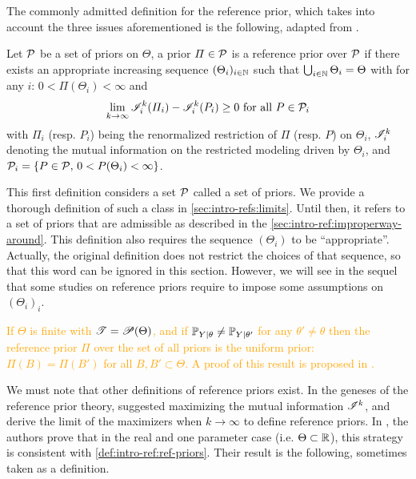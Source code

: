 The commonly admitted definition for the reference prior, which takes into account the three issues aforementioned is the following, adapted from \cite{dey_reference_2005}.
\begin{defi}\label{def:intro-ref:ref-priors}
    Let $\mathcal{P}$ be a set of priors on $\Theta$, a prior $\varPi\in\mathcal{P}$ %
    is a reference prior over $\mathcal{P}$ if there exists an appropriate increasing sequence $(\Theta_i)_{i\in\mathbb{N}}$ such that $\bigcup_{i\in\mathbb{N}}\Theta_i=\Theta$ with for any $i$: $0<\varPi(\Theta_i)<\infty  $ and
        \begin{equation}
            \lim_{k\rightarrow\infty} \mathscr{I}^k_i(\varPi_i) - \mathscr{I}^k_i(P_i) \geq 0 \text{\ for all\ } P\in\mathcal{P}_i
        \end{equation}
    with $\varPi_i$ (resp. $P_i$) being the renormalized restriction of $\varPi$ (resp. $P$) on $\Theta_i$, $\mathscr{I}_i^k$ denoting the mutual information on the restricted modeling driven by $\Theta_i$, and $\mathcal{P}_i=\{P\in\mathcal{P},\,0<P(\Theta_i)<\infty\}$.
\end{defi}

This first definition considers a set $\mathcal{P}$ called a set of priors. 
We provide a thorough definition of such a class in \cref{sec:intro-refs:limits}.
Until then, it refers to a set of priors that are admissible as described in the \cref{sec:intro-ref:improperway-around}.
This definition also
requires the sequence $(\Theta_i)$ to be ``appropriate''.
Actually,  the original definition does not restrict the choices of that sequence, so that this word can be ignored in this section.
However, we will see in the sequel that some studies on reference priors require to impose some assumptions on $(\Theta_i)_i$. 

\textcolor{orange}{
\begin{ex}
    If $\Theta$ is finite with $\mathscr{T}=\mathscr{P}(\Theta)$, and if $\mathbb{P}_{Y|\theta}\ne\mathbb{P}_{Y|\theta'}$ for any $\theta'\ne\theta$ then the reference prior $\varPi$ over the set of all priors is the uniform prior: $\varPi(B)=\varPi(B')$ for all $B,B'\subset\Theta$. A proof of this result is proposed in \cite{mure_objective_2018}.
\end{ex}
}


We must note that other definitions of reference priors exist.
In the geneses of the reference prior theory, \citet{bernardo_reference_1979} suggested maximizing the mutual information $\mathscr{I}^k$, and derive the limit of the maximizers when $k\to\infty$ to define reference priors.
In \cite{berger_formal_2009}, the authors prove that in the real and one parameter case (i.e. $\Theta\subset\mathbb{R}$), this strategy is consistent with \cref{def:intro-ref:ref-priors}. Their result is the following, sometimes taken as a definition.

